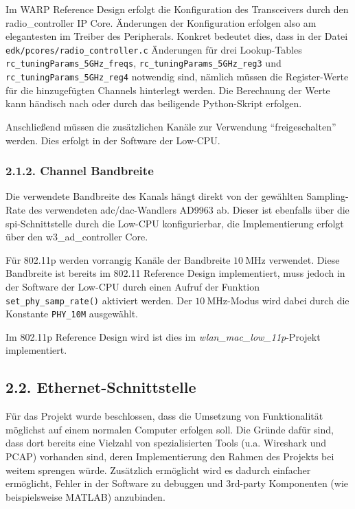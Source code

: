 \documentclass[ngerman,]{scrartcl}
\begin{document}
Im WARP Reference Design erfolgt die Konfiguration des Transceivers
durch den radio\_controller IP Core. Änderungen der Konfiguration
erfolgen also am elegantesten im Treiber des Peripherals. Konkret
bedeutet dies, dass in der Datei \texttt{edk/pcores/radio\_controller.c}
Änderungen für drei Lookup-Tables
\texttt{rc\_tuningParams\_5GHz\_freqs},
\texttt{rc\_tuningParams\_5GHz\_reg3} und
\texttt{rc\_tuningParams\_5GHz\_reg4} notwendig sind, nämlich müssen die
Register-Werte für die hinzugefügten Channels hinterlegt werden. Die
Berechnung der Werte kann händisch nach \autocite{max2829} oder durch
das beiligende Python-Skript erfolgen.

Anschließend müssen die zusätzlichen Kanäle zur Verwendung
``freigeschalten'' werden. Dies erfolgt in der Software der Low-CPU.

\subsubsection{2.1.2. Channel Bandbreite}\label{channel-bandbreite}

Die verwendete Bandbreite des Kanals hängt direkt von der gewählten
Sampling-Rate des verwendeten \ac{adc}/\ac{dac}-Wandlers AD9963 ab.
Dieser ist ebenfalls über die \ac{spi}-Schnittstelle durch die Low-CPU
konfigurierbar, die Implementierung erfolgt über den w3\_ad\_controller
Core.

Für 802.11p werden vorrangig Kanäle der Bandbreite
\(\SI{10}{\mega\hertz}\) verwendet. Diese Bandbreite ist bereits im
802.11 Reference Design implementiert, muss jedoch in der Software der
Low-CPU durch einen Aufruf der Funktion \texttt{set\_phy\_samp\_rate()}
aktiviert werden. Der \(\SI{10}{\mega\hertz}\)-Modus wird dabei durch
die Konstante \texttt{PHY\_10M} ausgewählt.

Im 802.11p Reference Design wird ist dies im
\emph{wlan\_mac\_low\_11p}-Projekt implementiert.

\subsection{2.2. Ethernet-Schnittstelle}\label{ethernet-schnittstelle}

Für das Projekt wurde beschlossen, dass die Umsetzung von Funktionalität
möglichst auf einem normalen Computer erfolgen soll. Die Gründe dafür
sind, dass dort bereits eine Vielzahl von spezialisierten Tools (u.a.
Wireshark und PCAP) vorhanden sind, deren Implementierung den Rahmen des
Projekts bei weitem sprengen würde. Zusätzlich ermöglicht wird es
dadurch einfacher ermöglicht, Fehler in der Software zu debuggen und
3rd-party Komponenten (wie beispielsweise MATLAB) anzubinden.
\end{document}
